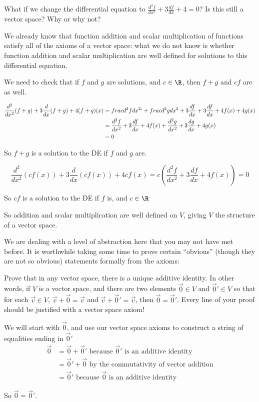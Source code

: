 \documentclass{ximera}
\begin{document}
What if we change the differential equation to $\frac{d^2f}{dx^2} + 3\frac{df}{dx} +4 = 0$?  Is this still a vector space?  Why or why not?
\begin{free-response}
  We already know that function addition and scalar multiplication of functions satisfy all of the axioms of a vector space:  what we do not know is whether
  function addition and scalar multiplication are well defined for solutions to this differential equation.  
			
  We need to check that if $f$ and $g$ are solutions, and $c\in \R$, then $f+g$ and $cf$ are as well.
			
  \begin{align*}
    \frac{d^2}{dx^2}(f+g) + 3\frac{d}{dx}(f+g)+4(f+g)(x) &=  frac{d^2f}{dx^2} `+ frac{d^2g}{dx^2} + 3\frac{df}{dx} + 3\frac{df}{dx} +4f(x)+4g(x)\\
    &= \frac{d^2f}{dx^2} + 3\frac{df}{dx} +4f(x) + \frac{d^2g}{dx^2} + 3\frac{dg}{dx} +4g(x) \\
    &= 0
  \end{align*}
  
  So $f+g$ is a solution to the DE if $f$ and $g$ are.
  
  \[ \frac{d^2}{dx^2} (cf(x))+ 3\frac{d}{dx} (cf(x)) +4cf(x) = c(\frac{d^2f}{dx^2} + 3\frac{df}{dx} +4f(x)) = 0\]
  
  So $cf$ is a solution to the DE if $f$ is, and $c\in \R$
  
  So  addition and scalar multiplication are well defined on $V$, giving $V$ the structure of a vector space.
\end{free-response}

We are dealing with a level of abstraction here that you may not have
met before.  It is worthwhile taking some time to prove certain
``obvious'' (though they are not so obvious) statements
formally from the axioms:
	
Prove that in any vector space, there is a unique additive identity.  In other words, if $V$ is a vector space, and there are two elements $\vec{0} \in V$ and $\vec{0}' \in V$ so that for each 
$\vec{v} \in V$, $\vec{v}+\vec{0}=\vec{v}$ and $\vec{v} + \vec{0}' = \vec{v}$, then $\vec{0}=\vec{0}'$.  Every line of your proof should be justified with a vector space axiom!
		
\begin{free-response}
  We will start with $\vec{0}$, and use our vector space axioms to construct a string of equalities ending in $\vec{0}'$
  \begin{align*}
    \vec{0} &= \vec{0}+\vec{0}' \text{ because $\vec{0}'$ is an additive identity}\\
    &= \vec{0}'+\vec{0} \text{ by the commutativity of vector addition}\\
    &=\vec{0}'\text{ because $\vec{0}$ is an additive identity}
  \end{align*}
  
  So $\vec{0} = \vec{0}'$.
\end{free-response}	
		
\end{document}

